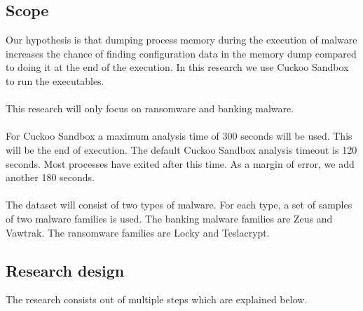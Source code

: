 \documentclass[conference]{IEEEtran}
\begin{document}
\subsection{Scope}
Our hypothesis is that dumping process memory during the execution of malware increases the chance of finding configuration data in the memory dump compared to doing it at the end of the execution. In this research we use Cuckoo Sandbox to run the executables. \\\\This research will only focus on ransomware and banking malware. \\\\For Cuckoo Sandbox a maximum analysis time of 300 seconds will be used. This will be the end of execution. The default Cuckoo Sandbox analysis timeout is 120 seconds. Most processes have exited after this time. As a margin of error, we add another 180 seconds. \\\\The dataset will consist of two types of malware. For each type, a set of samples of two malware families is used. The banking malware families are Zeus and Vawtrak. The ransomware families are Locky and Teslacrypt.


\subsection{Research design}
The research consists out of  multiple steps which are explained below.\\
\end{document}
